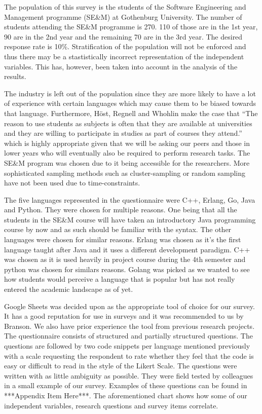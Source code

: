 \documentclass[times, 10pt,twocolumn]{IEEEtran}
\begin{document}
The population of this survey is the students of the Software Engineering and Management programme (SE\&M) at Gothenburg University. The number of students attending the SE\&M programme is 270. 110 of those are in the 1st year, 90 are in the 2nd year and the remaining 70 are in the 3rd year. The desired response rate is 10\%. Stratification of the population will not be enforced and thus there may be a stastistically incorrect representation of the independent variables. This has, however, been taken into account in the analysis of the results. 
\newline

The industry is left out of the population since they are more likely to have a lot of experience with certain languages which may cause them to be biased towards that language. Furthermore, Höst, Regnell and Whohlin \cite{host2000using} make the case that ``The reason to use students as subjects is often that they are available at universities and they are willing to participate in studies as part of courses they attend.'' which is highly appropriate given that we will be asking our peers and those in lower years who will eventually also be required to perform research tasks. The SE\&M program was chosen due to it being accessible for the researchers. More sophisticated sampling methods such as cluster-sampling or random sampling have not been used due to time-constraints. 



The five languages represented in the questionnaire were C++, Erlang, Go, Java and Python. They were chosen for multiple reasons. One being that all the students in the SE\&M course will have taken an introductory Java programming course by now and as such should be familiar with the syntax. The other languages were chosen for similar reasons. Erlang was chosen as it's the first language taught after Java and it uses a different development paradigm. C++ was chosen as it is used heavily in project course during the 4th semester and python was chosen for similars reasons. Golang was picked as we wanted to see how students would perceive a language that is popular but has not really entered the academic landscape as of yet.
\newline

Google Sheets was decided upon as the appropriate tool of choice for our survey. It has a good reputation for use in surveys and it was recommended to us by Branson. We also have prior experience the tool from previous research projects.
The questionnaire consists of structured and partially structured questions. The questions are followed by two code snippets per language mentioned previously with a scale requesting the respondent to rate whether they feel that the code is easy or difficult to read in the style of the Likert Scale. The questions were written with as little ambiguity as possible. They were field tested by colleagues in a small example of our survey. Examples of these questions can be found in ***Appendix Item Here***. The aforementioned chart shows how some of our independent variables, research questions and survey items correlate.
\newline
\end{document}
